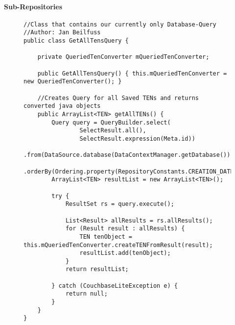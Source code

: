		\paragraph{Sub-Repositories}
\begin{figure}[H]
\begin{lstlisting}[caption=GetAllTensQuery (Jan Beilfuß)]
//Class that contains our currently only Database-Query
//Author: Jan Beilfuss
public class GetAllTensQuery {

    private QueriedTenConverter mQueriedTenConverter;

    public GetAllTensQuery() { this.mQueriedTenConverter = new QueriedTenConverter(); }

    //Creates Query for all Saved TENs and returns converted java objects
    public ArrayList<TEN> getAllTENs() {
        Query query = QueryBuilder.select(
                SelectResult.all(),
                SelectResult.expression(Meta.id))
                .from(DataSource.database(DataContextManager.getDatabase()))
                .orderBy(Ordering.property(RepositoryConstants.CREATION_DATE_KEY).descending());
        ArrayList<TEN> resultList = new ArrayList<TEN>();

        try {
            ResultSet rs = query.execute();

            List<Result> allResults = rs.allResults();
            for (Result result : allResults) {
                TEN tenObject = this.mQueriedTenConverter.createTENFromResult(result);
                resultList.add(tenObject);
            }
            return resultList;

        } catch (CouchbaseLiteException e) {
            return null;
        }
    }
}
\end{lstlisting}
\end{figure}

